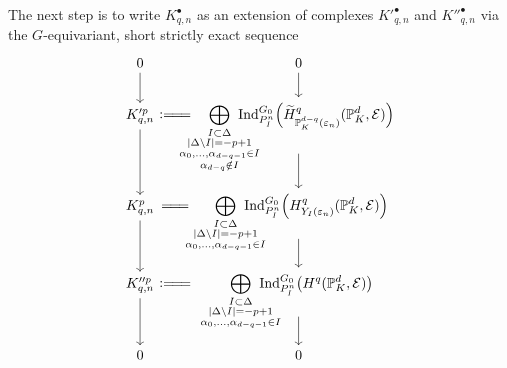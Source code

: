 \documentclass[a4paper, reqno, 10pt]{amsart}
\theoremstyle{definition}
\numberwithin{equation}{section}
\newcommand{\abs}[1]{{\lvert{#1}\rvert}}
\newcommand{\defeq}{\vcentcolon=}
\newcommand{\Ind}{{\mathrm{Ind}}}
\newcommand{\BP}{{\mathbb {P}}}
\newcommand{\CE}{{\mathcal {E}}}
\begin{document}
The next step is to write $K^\bullet_{q,n}$ as an extension of complexes $K'^{\bullet}_{q,n}$ and $K''^{\bullet}_{q,n}$ via the $G$-equivariant, short strictly exact sequence
\begin{equation*}
	\begin{tikzcd}[column sep= 0pt]
		0 \ar[d] &[-5pt] & 0 \ar[d] \\
		K'^p_{q,n} \ar[d] &[-5pt]\defeq\joinrel=\joinrel= & \hspace{-0.6cm}\displaystyle\bigoplus\limits_{\substack{I\subset \Delta \\ \abs{\Delta\setminus I}=-p+1 \\ \alpha_0,\ldots,\alpha_{d-q-1} \in I \\ \alpha_{d-q} \notin I}} \hspace{-0.6cm} \Ind^{G_0}_{P_I^n} \Big( \widetilde{H}^q_{\BP_K^{d-q}(\varepsilon_n)} (\BP_K^d, \CE) \Big) \ar[d, start anchor ={[yshift=4ex]}] \\[-10pt]
		K_{q,n}^{p} \ar[d]&[-5pt] =\joinrel=\joinrel=  & \hspace{-0.6cm}\displaystyle\bigoplus\limits_{\substack{I\subset \Delta \\ \abs{\Delta\setminus I}=-p+1 \\ \alpha_0,\ldots,\alpha_{d-q-1} \in I }} \hspace{-0.6cm} \Ind^{G_0}_{P_I^n} \Big( H^q_{Y_I(\varepsilon_n)} (\BP_K^d, \CE) \Big) \ar[d, start anchor ={[yshift=3ex]}] \\[-10pt]
		K''^p_{q,n} \ar[d] &[-5pt] \defeq\joinrel=\joinrel= & \hspace{-0.6cm}\displaystyle\bigoplus\limits_{\substack{I\subset \Delta \\ \abs{\Delta\setminus I}=-p+1 \\ \alpha_0,\ldots,\alpha_{d-q-1} \in I }} \hspace{-0.6cm} \Ind^{G_0}_{P_I^n} \big( H^q (\BP_K^d, \CE) \big) \ar[d, start anchor ={[yshift=3ex]}] \\[-10pt]
		0 &[-5pt] & 0
	\end{tikzcd}
\end{equation*}
\end{document}
